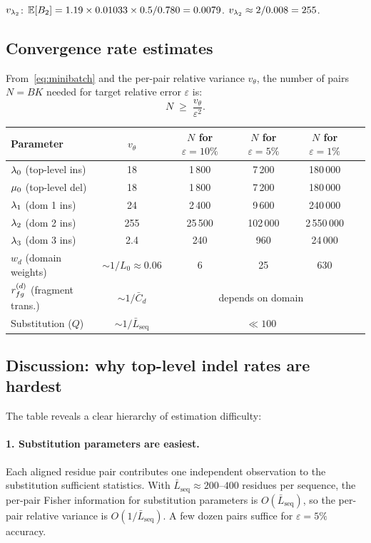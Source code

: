 $v_{\lambda_2}$: $\mathbb{E}[B_2] = 1.19 \times 0.01033 \times 0.5 / 0.780 = 0.0079$.
$v_{\lambda_2} \approx 2/0.008 = 255$.


\subsection{Convergence rate estimates}
\label{sec:svb-mixdom-rate-estimates}

From~\eqref{eq:minibatch} and the per-pair relative variance
$v_\theta$, the number of pairs $N = BK$ needed for target relative
error $\varepsilon$ is:
\begin{equation}\label{eq:N-needed}
N \;\geq\; \frac{v_\theta}{\varepsilon^2}.
\end{equation}

\begin{center}
\renewcommand{\arraystretch}{1.3}
\begin{tabular}{lccccc}
\toprule
Parameter & $v_\theta$ & $N$ for $\varepsilon{=}10\%$
  & $N$ for $\varepsilon{=}5\%$ & $N$ for $\varepsilon{=}1\%$ \\
\midrule
$\lambda_0$ (top-level ins) & 18 & 1\,800 & 7\,200 & 180\,000 \\
$\mu_0$ (top-level del) & 18 & 1\,800 & 7\,200 & 180\,000 \\
$\lambda_1$ (dom 1 ins) & 24 & 2\,400 & 9\,600 & 240\,000 \\
$\lambda_2$ (dom 2 ins) & 255 & 25\,500 & 102\,000 & 2\,550\,000 \\
$\lambda_3$ (dom 3 ins) & 2.4 & 240 & 960 & 24\,000 \\
$w_d$ (domain weights) & $\sim 1/L_0 \approx 0.06$ & 6 & 25 & 630 \\
$r^{(d)}_{fg}$ (fragment trans.) & $\sim 1/\bar{C}_d$ & \multicolumn{3}{c}{depends on domain} \\
Substitution ($Q$) & $\sim 1/\bar{L}_{\text{seq}}$ & \multicolumn{3}{c}{$\ll 100$} \\
\bottomrule
\end{tabular}
\end{center}

\subsection{Discussion: why top-level indel rates are hardest}

The table reveals a clear hierarchy of estimation difficulty:

\paragraph{1. Substitution parameters are easiest.}
Each aligned residue pair contributes one independent observation
to the substitution sufficient statistics.
With $\bar{L}_{\text{seq}} \approx 200$--$400$ residues per sequence,
the per-pair Fisher information for substitution parameters is
$O(\bar{L}_{\text{seq}})$, so the per-pair relative variance is
$O(1/\bar{L}_{\text{seq}})$.
A few dozen pairs suffice for $\varepsilon = 5\%$ accuracy.

